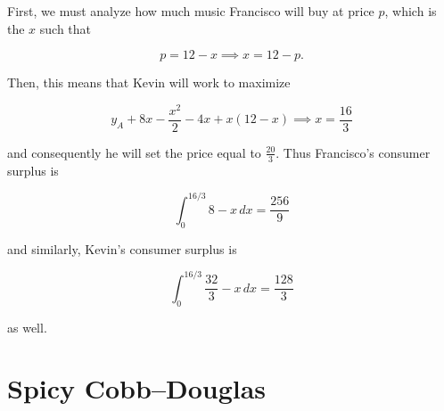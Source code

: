\documentclass[11pt]{article}
\begin{document}
\begin{enumerate}
\begin{sol}
First, we must analyze how much music Francisco will buy at price $p$, which is
the $x$ such that

$$p = 12 - x \implies x = 12 - p.$$

Then, this means that Kevin will work to maximize

$$y_A + 8x - \dfrac{x^2}{2} - 4x + x(12 - x) \implies x = \dfrac{16}{3}$$

and consequently he will set the price equal to $\frac{20}{3}$. Thus Francisco's
consumer surplus is

$$\int_0^{16/3} 8 - x\, dx = \dfrac{256}{9}$$

and similarly, Kevin's consumer surplus is

$$\int_0^{16/3} \dfrac{32}{3} - x \, dx = \dfrac{128}{3}$$

as well.

\end{sol}


\end{enumerate}
\section{Spicy Cobb--Douglas}
\end{document}
